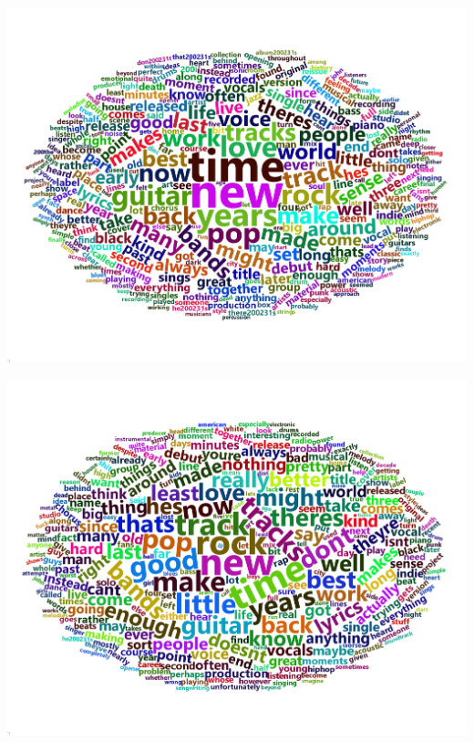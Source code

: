 \documentclass[a4paper,12pt]{article}
\begin{document}
\begin{center}
\includegraphics[width = \linewidth]{"figures/wordcloud.png"}
\end{center}
\begin{center}
\includegraphics[width = \linewidth]{"figures/wordcloud_bad.png"}
\end{center}











	
\end{document}
